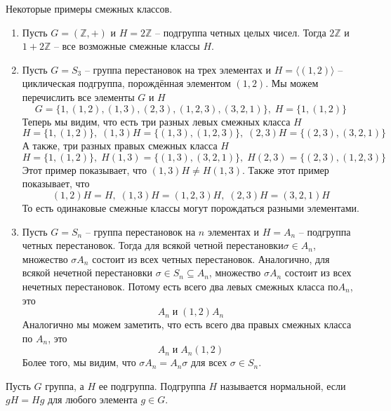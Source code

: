 \begin{examples}
Некоторые примеры смежных классов.
\begin{enumerate}
\item Пусть $G = (\mathbb Z, +)$ и $H = 2\mathbb Z$  -- подгруппа четных целых чисел.
Тогда $2\mathbb Z$ и $1 + 2\mathbb Z$ -- все возможные смежные классы $H$.

\item Пусть $G = S_3$ -- группа перестановок на трех элементах и $H = \langle (1, 2)\rangle$ -- циклическая подгруппа, порождённая элементом $(1,2)$.
Мы можем перечислить все элементы $G$ и $H$
\[
G = \{1, (1,2), (1, 3), (2, 3), (1, 2, 3), (3, 2, 1)\},\; H = \{1, (1, 2)\}
\]
Теперь мы видим, что есть три разных левых смежных класса $H$
\[
H = \{1, (1, 2)\}, \;(1,3)H = \{(1, 3), (1, 2, 3)\},\;(2, 3)H = \{(2, 3), (3,2,1)\}
\]
А также, три разных правых смежных класса $H$
\[
H =  \{1, (1, 2)\}, \; H(1, 3) = \{(1, 3), (3, 2, 1)\},\; H (2, 3) = \{(2, 3), (1, 2, 3)\}
\]
Этот пример показывает, что $(1, 3) H \neq H (1, 3)$.
Также этот пример показывает, что
\[
(1, 2)H = H,\; (1, 3)H = (1, 2, 3)H,\; (2, 3)H = (3, 2, 1)H
\]
То есть одинаковые смежные классы могут порождаться разными элементами.

\item Пусть $G = S_n$ -- группа перестановок на $n$ элементах и $H = A_n$ -- подгруппа четных перестановок.
Тогда для всякой четной перестановки$\sigma \in A_n$, множество $\sigma A_n$ состоит из всех четных перестановок.
Аналогично, для всякой нечетной перестановки $\sigma\in S_n\subseteq A_n$, множество $\sigma A_n$ состоит из всех нечетных перестановок.
Потому есть всего два левых смежных класса по$A_n$, это
\[
A_n\;\text{и}\;(1, 2) A_n
\]
Аналогично мы можем заметить, что есть всего два правых смежных класса по $A_n$, это
\[
A_n\;\text{и}\; A_n(1, 2)
\]
Более того, мы видим, что $\sigma A_n = A_n \sigma$ для всех $\sigma \in S_n$.
\end{enumerate}
\end{examples}

\begin{definition}
Пусть $G$ группа, а $H$ ее подгруппа.
Подгруппа $H$ называется нормальной, если $gH = Hg$ для любого элемента $g\in G$.
\end{definition}

